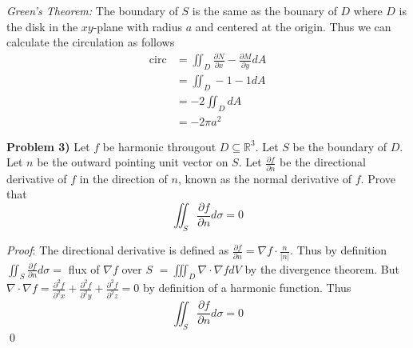 \documentclass[12pt]{article}
\newcommand{\problem}[1]{\hspace{-4 ex} \large \textbf{Problem #1} }
\renewenvironment{proof}{\hspace{-4 ex} \emph{Proof}:}{\qed}
\newcommand{\RR}{\mathbb{R}}
\begin{document}
	\emph{Green's Theorem:} The boundary of $S$ is the same as the bounary of $D$ where $D$ is the disk in the $xy$-plane with radius $a$ and centered at the origin. Thus we can calculate the circulation as follows
	\begin{align*}
		\text{circ} & = \iint_D \frac{\partial N}{\partial x} - \frac{\partial M}{\partial y} dA \\
		& = \iint_D -1 - 1 dA \\
		& = -2 \iint_D dA \\
		& = -2 \pi a^2
	\end{align*}
	
\problem{3)} Let $f$ be harmonic througout $D \subseteq \RR^3$. Let $S$ be the boundary of $D$. Let $n$ be the outward pointing unit vector on $S$. Let $\tfrac{\partial f}{\partial n}$ be the directional derivative of $f$ in the direction of $n$, known as the normal derivative of $f$. Prove that 
$$
\iint_S \frac{\partial f}{\partial n} d \sigma = 0
$$

	\begin{proof}
		The directional derivative is defined as $\tfrac{\partial f}{\partial n} = \nabla f \cdot \tfrac{n}{\vert n \vert}$. Thus by definition 
		$\iint_S \frac{\partial f}{\partial n} d \sigma = $ flux of $\nabla f$ over $S$ $ = \iiint_D \nabla \cdot \nabla f dV$ by the divergence theorem. But $\nabla \cdot \nabla f = \tfrac{\partial^2 f}{\partial^2 x} + \tfrac{\partial^2 f}{\partial^2 y} + \tfrac{\partial^2 f}{\partial^2 z} = 0$ by definition of a harmonic function. Thus
		$$
		\iint_S \frac{\partial f}{\partial n} d \sigma = 0
		$$
	\end{proof}
\end{document}
